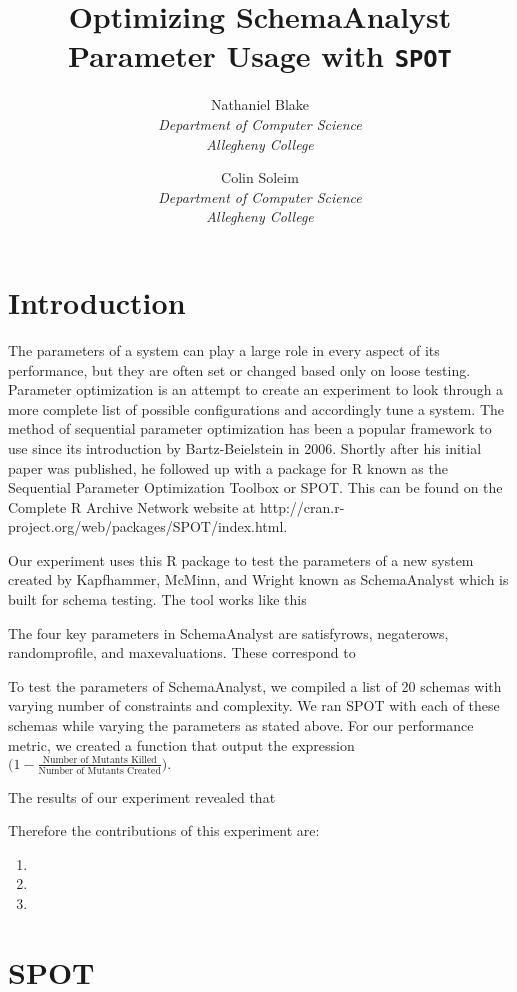 \documentclass[a4paper,twocolumn]{article}
\title{Optimizing SchemaAnalyst Parameter Usage with \texttt{SPOT}}
\author{Nathaniel Blake \\ \textit{Department of Computer Science} \\ \textit{Allegheny College} \and Colin Soleim \\ \textit{Department of Computer Science} \\ \textit{Allegheny College}}
\date{}
\begin{document}
\maketitle

\section{Introduction}

The parameters of a system can play a large role in every aspect of its performance, but they are often set or changed based only on loose testing. Parameter optimization is an attempt to create an experiment to look through a more complete list of possible configurations and accordingly tune a system. The method of sequential parameter optimization has been a popular framework to use since its introduction by Bartz-Beielstein in 2006. Shortly after his initial paper was published, he followed up with a package for R known as the Sequential Parameter Optimization Toolbox or SPOT. This can be found on the Complete R Archive Network website at http://cran.r-project.org/web/packages/SPOT/index.html. 

Our experiment uses this R package to test the parameters of a new system created by Kapfhammer, McMinn, and Wright known as SchemaAnalyst which is built for schema testing. The tool works like this

The four key parameters in SchemaAnalyst are satisfyrows, negaterows, randomprofile, and maxevaluations. These correspond to 

To test the parameters of SchemaAnalyst, we compiled a list of 20 schemas with varying number of constraints and complexity. We ran SPOT with each of these schemas while varying the parameters as stated above. For our performance metric, we created a function that output the expression $ \big( 1 - \frac{\text{Number of Mutants Killed}}{\text{Number of Mutants Created}} \big). $

The results of our experiment revealed that 

Therefore the contributions of this experiment are:

\begin{enumerate}
\item
\item
\item
\end{enumerate}

\section{SPOT} \label{sec:SPOT}
\end{document}
